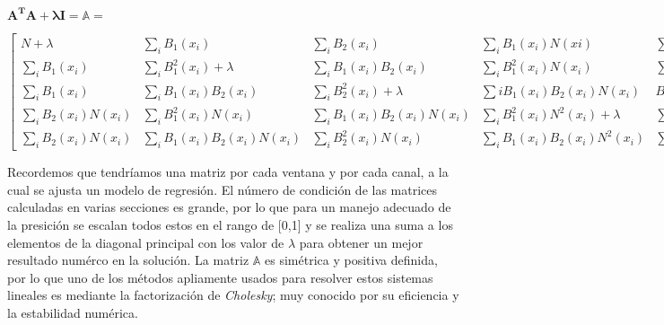 $\mathbf{A^{T}A + \lambda I} = \mathbb{A} = $

\begingroup\makeatletter{}
$
\begin{bmatrix}
N + \lambda & \sum_{i}B_{1}(x_{i})&\sum_{i}B_{2}(x_{i})&\sum_{i}B_{1}(x_{i})N(xi)&\sum_{i}B_{2}(x_{i})N(xi)&\sum_{i}B_{1}(x_{i})N^{2}(xi)&\sum_{i}B_{2}(x_{i})N^{2}(xi)\\
\sum_{i}B_{1}(x_{i})&\sum_{i}B_{1}^{2}(x_{i}) + \lambda & \sum_{i}B_{1}(x_{i})B_{2}(x_{i})&\sum_{i}B_{1}^{2}(x_{i})N(x_{i})&\sum_{i}B_{1}(x_{i})B_{2}(x_{i})N(x_{i})&\sum_{i}B_{1}^{2}(x_{i})N^{2}(x_{i})&\sum_{i}B_{1}(x_{i})B_{2}(x_{i})N^{2}(x_{i})\\
\sum_{i}B_{1}(x_{i})&\sum_{i}B_{1}(x_{i})B_{2}(x_{i})&\sum_{i}B_{2}^{2}(x_{i}) + \lambda&\sum{i} B_{1}(x_{i})B_{2}(x_{i})N(x_{i}) & B_{2}^{2}(x_{i})N(x_{i})&B_{1}(x_{i})B_{2}(x_{i})N^{2}(x_{i})&B_{2}^{2}(x_{i})N^{2}(x_{i})\\
\sum_{i}B_{2}(x_{i})N(x_{i}) & \sum_{i}B_{1}^{2}(x_{i})N(x_{i})&\sum_{i} B_{1}(x_{i})B_{2}(x_{i})N(x_{i})&\sum_{i}B_{1}^{2}(x_{i})N^{2}(x_{i})+\lambda&\sum_{i}B_{1}(x_{i})B_{2}(x_{i})N^{2}(x_{i})&\sum_{i}B_{1}^{2}(x_{i})N^{3}(x_{i})&\sum_{i}B_{1}(x_{i})B_{2}(x_{i})N^{3}(x_{i})\\
\sum_{i}B_{2}(x_{i})N(x_{i})&\sum_{i}B_{1}(x_{i})B_{2}(x_{i})N(x_{i})&\sum_{i}B_{2}^{2}(x_{i})N(x_{i})&\sum_{i}B_{1}(x_{i})B_{2}(x_{i})N^{2}(x_{i})&\sum_{i}B_{2}^{2}(x_{i})N^{2}(x_{i}) + \lambda&\sum_{i}B_{1}(x_{i})B_{2}(x_{i})N^{3}(x_{i})&\sum_{i}B_{2}^{2}(x_{i})N^{3}(x_{i})	 	
\end{bmatrix} $\endgroup

Recordemos que tendríamos una matriz por cada ventana y por cada canal, a la cual se ajusta un modelo de regresión. El número de condición de las matrices calculadas en varias secciones es grande, por lo que para un manejo adecuado de la presición se escalan todos estos en el rango de [0,1] y se realiza una suma a los elementos de la diagonal principal con los valor de $\lambda$ para obtener un mejor resultado numérco en la solución. La matriz $\mathbb{A}$ es simétrica y positiva definida, por lo que uno de los métodos apliamente usados para resolver estos sistemas lineales es mediante la factorización de \textit{Cholesky}; muy conocido por su eficiencia y la estabilidad numérica. 

